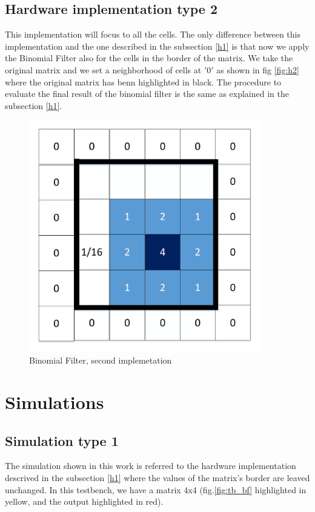      \subsection{Hardware implementation type 2} \label{h2}
     This implementation will focus to all the cells. 
     The only difference between this implementation and the one  described in the subsection \ref{h1} is that now we apply the Binomial Filter also for the cells in the border of the matrix.
     We take the original matrix and we set a neighborhood of cells at $ '0' $ as shown in fig \ref{fig:h2} where the original matrix has benn highlighted in black.
     The procedure to evaluate the final result of the binomial filter is the same as explained in the subsection  \ref{h1}.
      \begin{figure}[h!]
      	\centering	
      	\includegraphics[width=0.9\textwidth]{imm/bf/bf_h2.pdf}  
      	\caption{Binomial Filter, second implemetation} 
      	\label{fig:fig:h2}
      \end{figure} 
     \section{Simulations}   
     \subsection{Simulation type 1} \label{sim1}
     The simulation shown in this work is referred to the hardware implementation descrived in the subsection \ref{h1} where the values of the matrix's border are leaved unchanged.
     In this testbench, we have a matrix 4x4 (fig.\ref{fig:tb_bf} highlighted in yellow, and the output highlighted in red).
    
